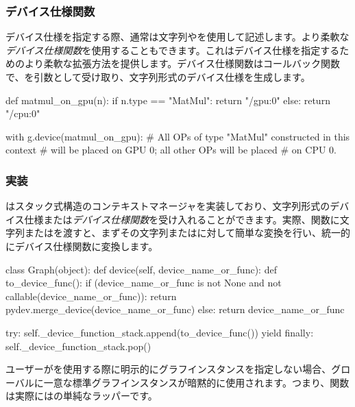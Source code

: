 \begin{content}
\subsubsection{デバイス仕様関数}

デバイス仕様を指定する際、通常は文字列やを使用して記述します。より柔軟な\emph{デバイス仕様関数}を使用することもできます。これはデバイス仕様を指定するためのより柔軟な拡張方法を提供します。デバイス仕様関数はコールバック関数で、を引数として受け取り、文字列形式のデバイス仕様を生成します。

\begin{leftbar}
\begin{python}
def matmul_on_gpu(n):
 if n.type == "MatMul":
   return "/gpu:0"
 else:
   return "/cpu:0"

with g.device(matmul_on_gpu):
  # All OPs of type "MatMul" constructed in this context
  # will be placed on GPU 0; all other OPs will be placed
  # on CPU 0.
\end{python}
\end{leftbar}

\subsubsection{実装}

はスタック式構造のコンテキストマネージャを実装しており、文字列形式のデバイス仕様または\emph{デバイス仕様関数}を受け入れることができます。実際、関数に文字列またはを渡すと、まずその文字列またはに対して簡単な変換を行い、統一的にデバイス仕様関数に変換します。

\begin{leftbar}
\begin{python}
class Graph(object):
  def device(self, device_name_or_func):
    def to_device_func():
      if (device_name_or_func is not None
          and not callable(device_name_or_func)):
        return pydev.merge_device(device_name_or_func)
      else:
        return device_name_or_func

    try:
      self._device_function_stack.append(to_device_func())
      yield
    finally:
      self._device_function_stack.pop()
\end{python}
\end{leftbar}

ユーザーがを使用する際に明示的にグラフインスタンスを指定しない場合、グローバルに一意な標準グラフインスタンスが暗黙的に使用されます。つまり、関数は実際にはの単純なラッパーです。


\end{content}
